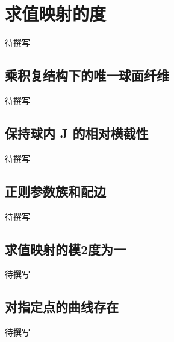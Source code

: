 
% 
% 
% 
% 
% 
% 
% 

\section{求值映射的度}
\label{g4:sec:2403}

待撰写

\subsection{乘积复结构下的唯一球面纤维}
\label{g4:subsec:2403:01}
待撰写

\subsection{保持球内 J 的相对横截性}
\label{g4:subsec:2403:02}
待撰写

\subsection{正则参数族和配边}
\label{g4:subsec:2403:03}
待撰写

\subsection{求值映射的模2度为一}
\label{g4:subsec:2403:04}
待撰写

\subsection{对指定点的曲线存在}
\label{g4:subsec:2403:05}
待撰写
